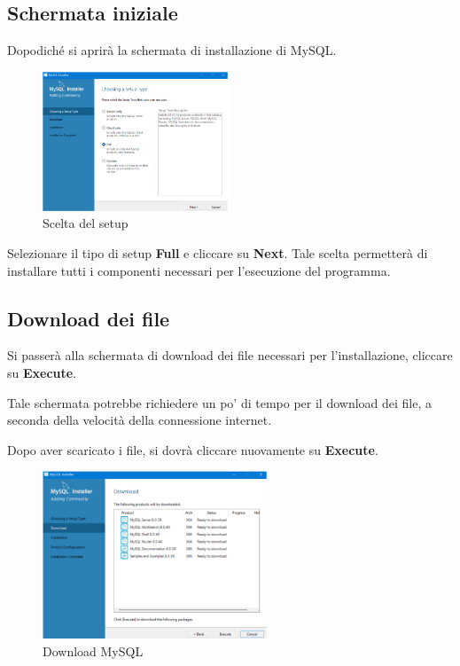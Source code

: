 \subsection{Schermata iniziale}

Dopodiché si aprirà la schermata di installazione di MySQL.

\begin{figure}[h!]
    \centering
    \includegraphics[width= 0.5\textwidth]{images/inizio mysql.png}
    \caption{Scelta del setup}
\end{figure}

Selezionare il tipo di setup \textbf{Full} e cliccare su \textbf{Next}. Tale scelta permetterà di installare tutti i componenti necessari per l'esecuzione del programma.

\subsection{Download dei file}

Si passerà alla schermata di download dei file necessari per l'installazione, cliccare su \textbf{Execute}. 

\begin{tcolorbox}[  colback=white!5!white, colframe=gray, title={Avvertenza} ]
    
    
    Tale schermata potrebbe richiedere un po' di tempo per il download dei file, a seconda della velocità della connessione internet. 
\end{tcolorbox}
    
Dopo aver scaricato i file, si dovrà cliccare nuovamente su \textbf{Execute}.

\begin{figure}[h!]
    \centering
    \includegraphics[width= 0.6\textwidth]{images/eexecute.png}
    \caption{Download MySQL}
\end{figure}

